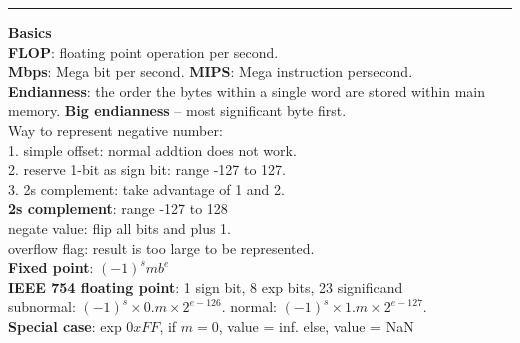 \documentclass[8pt,a4paper,landscape]{article}
\newcommand{\topic}[1]{\textbf{\large #1}}
\begin{document}
\begin{spacing}{-1}
\begin{multicols*}{3}
    \hrule \noindent
    \topic{Basics} \\
    \textbf{FLOP}: floating point operation per second. \\
    \textbf{Mbps}: Mega bit per second. \textbf{MIPS}: Mega instruction persecond. \\
    \textbf{Endianness}: the order the bytes within a single word are stored within main memory. 
    \textbf{Big endianness} -- most significant byte first. \\  
    Way to represent negative number: \\
    1. simple offset: normal addtion does not work. \\ 
    2. reserve 1-bit as sign bit: range -127 to 127. \\
    3. 2s complement: take advantage of 1 and 2.  \\
    \textbf{2s complement}: range -127 to 128 \\
    negate value: flip all bits and plus 1. \\
    overflow flag: result is too large to be represented. \\
    \textbf{Fixed point}: $(-1)^s m b^e$  \\
    \textbf{IEEE 754 floating point}:  1 sign bit, 8 exp bits, 23 significand \\
    subnormal: $(-1)^s \times 0.m \times 2^{e-126}$. 
    normal: $(-1)^s \times 1.m \times 2^{e-127}$. \\
    \textbf{Special case}: exp $0xFF$, if $m = 0$, value = inf. else, value = NaN \\


\end{multicols*}
\end{spacing}
\end{document}
